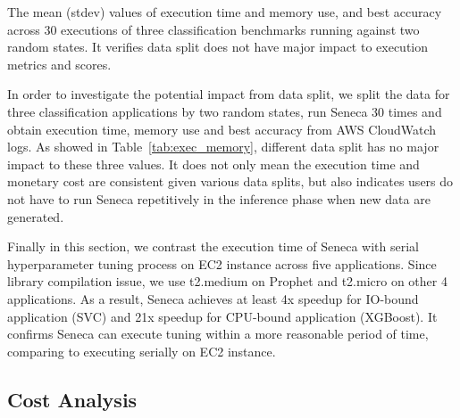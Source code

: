 \begin{table}[t]
\centering
\scriptsize

\caption{The mean (stdev) values of execution time and memory use, and best accuracy across 30 executions of three classification benchmarks running against two random states. It verifies data split does not have major impact to execution metrics and scores.
\label{tab:exec_memory}}
\end{table}

In order to investigate the potential impact from data split, we split the data for three classification applications by two random states, run Seneca 30 times and obtain execution time, memory use and best accuracy from AWS CloudWatch logs. As showed in Table~\ref{tab:exec_memory}, different data split has no major impact to these three values. It does not only mean the execution time and monetary cost are consistent given various data splits, but also indicates users do not have to run Seneca repetitively in the inference phase when new data are generated.

% 

Finally in this section, we contrast the execution time of Seneca with serial hyperparameter tuning process on EC2 instance across five applications. Since library compilation issue, we use t2.medium on Prophet and t2.micro on other 4 applications. As a result, Seneca achieves at least 4x speedup for IO-bound application (SVC) and 21x speedup for CPU-bound application (XGBoost). It confirms Seneca can execute tuning within a more reasonable period of time, comparing to executing serially on EC2 instance.

\subsection{Cost Analysis}




